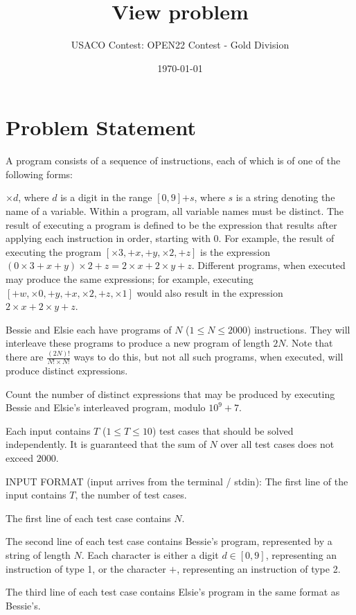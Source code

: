 \documentclass[12pt]{article}
\title{View problem}
\author{USACO Contest: OPEN22 Contest - Gold Division}
\date{\today}
\begin{document}
\maketitle

\section*{Problem Statement}

A program consists of a sequence of instructions, each of which is of one of the
following forms:

$\times d$, where $d$ is a digit in the range $[0,9]$$+s$, where $s$ is a string denoting the name of a variable. Within a
program, all variable names must be distinct.
The result of executing a program is defined to be the expression that results
after applying each instruction in order, starting with $0$. For example, the result of
executing the program  $[\times 3,+x,+y,\times 2,+z]$ is the expression
$(0\times 3+x+y)\times 2+z=2\times x+2\times y+z$. Different programs, when
executed may produce the same expressions; for example, executing
$[+w,\times 0,+y,+x,\times 2,+z, \times 1]$ would also result in the expression
$2\times x+2\times y+z$.

Bessie and Elsie each have programs of $N$ ($1\le N\le 2000$) instructions. They
will interleave these programs to produce a new program of length $2N$.  Note
that there are $\frac{(2N)!}{N!\times N!}$ ways to do this, but not all such
programs, when executed, will produce distinct expressions.

Count the number of distinct expressions that may be produced by executing
Bessie and Elsie's interleaved program, modulo $10^9+7$. 

Each input contains $T$ ($1\le T\le 10$)  test cases that should be solved
independently. It is guaranteed that the sum of $N$ over all test cases does not
exceed $2000$.

INPUT FORMAT (input arrives from the terminal / stdin):
The first line of the input contains $T$, the number of test cases.

The first line of each test case contains $N$.

The second line of each test case contains Bessie's program, represented by a
string of length $N$. Each character is either a digit $d\in [0,9]$,
representing an instruction of type 1, or the character $+$, representing an
instruction of type 2.

The third line of each test case contains Elsie's program in the same format as
Bessie's.
\end{document}
